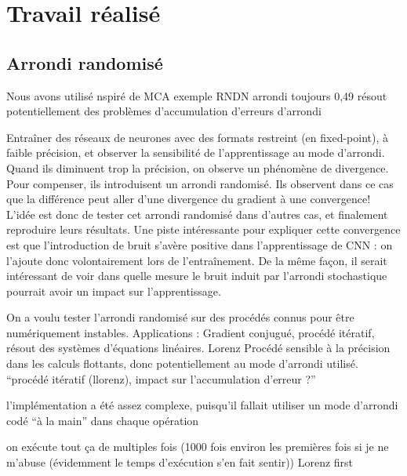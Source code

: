\documentclass[a4paper,11pt]{article}
\begin{document}


\section{Travail réalisé}

\subsection{Arrondi randomisé }
Nous avons utilisé nspiré de MCA
exemple RNDN arrondi toujours 0,49
résout potentiellement des problèmes d’accumulation d’erreurs d’arrondi

Entraîner des réseaux de neurones avec des formats restreint (en fixed-point), à faible précision, et observer la sensibilité de l’apprentissage au mode d’arrondi.
Quand ils diminuent trop la précision, on observe un phénomène de divergence. Pour compenser, ils introduisent un arrondi randomisé.
Ils observent dans ce cas que la différence peut aller d’une divergence du gradient à une convergence!
L’idée est donc de tester cet arrondi randomisé dans d’autres cas, et finalement reproduire leurs résultats.
Une piste intéressante pour expliquer cette convergence est que l’introduction de bruit s’avère positive dans l’apprentissage de CNN : on l’ajoute donc volontairement lors de l’entraînement. De la même façon, il serait intéressant de voir dans quelle mesure le bruit induit par l’arrondi stochastique pourrait avoir un impact sur l’apprentissage.


On a voulu tester l’arrondi randomisé sur des procédés connus pour être numériquement instables.
Applications : 
Gradient conjugué, procédé itératif, résout des systèmes d’équations linéaires.
Lorenz Procédé sensible à la précision dans les calculs flottants, donc potentiellement au mode d’arrondi utilisé.
“procédé itératif (llorenz), impact sur l’accumulation d’erreur ?”

l’implémentation a été assez complexe, puisqu’il fallait utiliser un mode d’arrondi codé “à la main” dans chaque opération

on exécute tout ça de multiples fois (1000 fois environ les premières fois si je ne m’abuse (évidemment le temps d’exécution s’en fait sentir))
Lorenz first
\end{document}
